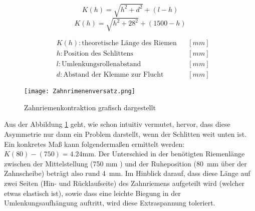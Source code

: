     \noindent\begin{minipage}{\textwidth}
        \vspace{4mm}
    \begin{minipage}[t]{0.5\textwidth}
        \begin{equation*}
            K(h) = \sqrt{h^2+d^2}+(l-h)
        \end{equation*}
        \begin{equation*}
            K(h) = \sqrt{h^2+28^2}+(1500-h)
        \end{equation*}
    \end{minipage}%
    \begin{minipage}[t]{0.5\textwidth}
        \vspace{-7mm}
        \begin{align*}
            &K(h): \text{theoretische Länge des Riemen} & &\left[mm\right]\\
            &h: \text{Position des Schlittens} & &\left[mm\right]\\
            &l: \text{Umlenkungsrollenabstand} & &\left[mm\right]\\
            &d: \text{Abstand der Klemme zur Flucht} & &\left[mm\right]
        \end{align*}
    \end{minipage}
    \end{minipage}

    \begin{figure}[H]
        \centering
        \texttt{[image: Zahnrimenenversatz.png]}
        \caption{Zahnriemenkontraktion grafisch dargestellt}
        \label{zahnriemenversatz}
    \end{figure}

    Aus der Abbildung \ref{zahnriemenversatz} geht, wie schon intuitiv vermutet, hervor, dass diese Asymmetrie nur dann ein Problem darstellt, wenn der Schlitten weit unten ist. Ein konkretes Maß kann folgendermaßen ermittelt werden: \(K(80) - (750) = 4.24\unit{\milli\meter}\). Der Unterschied in der benötigten Riemenlänge zwischen der Mittelstellung (750 \unit{\milli\meter} ) und der Ruheposition (\SI{80}{\mm} über der Zahnscheibe) beträgt also rund \SI{4}{\mm}. Im Hinblick darauf, dass diese Länge auf zwei Seiten (Hin- und Rücklaufseite) des Zahnriemens aufgeteilt wird (welcher etwas elastisch ist), sowie dass eine leichte Biegung in der Umlenkungsaufhängung auftritt, wird diese Extraspannung toleriert.

